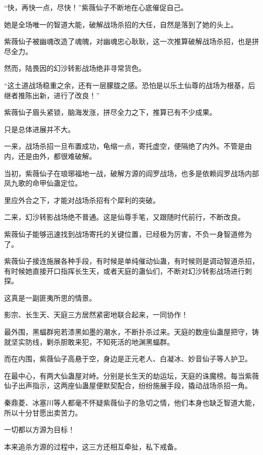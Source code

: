 
\begin{this_body}

“快，再快一点，尽快！”紫薇仙子不断地在心底催促自己。

她是全场唯一的智道大能，破解战场杀招的大任，自然是落到了她的头上。

紫薇仙子被幽魂改造了魂魄，对幽魂忠心耿耿，这一次推算破解战场杀招，也是拼尽全力。

然而，陆畏因的幻沙转影战场绝非寻常货色。

“这土道战场稳重之余，还有一层朦胧之感。恐怕是以乐土仙尊的战场为根基，后继者推陈出新，进行了改良！”

紫薇仙子眉头紧锁，脑海发涨，拼尽全力之下，推算已有不少成果。

只是总体进展并不大。

一来，战场杀招一旦布置成功，龟缩一点，寄托虚空，便隔绝了内外。不管是由内，还是由外，都很难破解。

当初，紫薇仙子在琅琊福地一战，破解方源的阎罗战场，也多是依赖阎罗战场内部凤九歌的命甲仙蛊定位。

里应外合之下，才能对战场杀招有个犀利的突破。

二来，幻沙转影战场绝不普通。这是仙尊手笔，又跟随时代前行，不断改良。

紫薇仙子能够迅速找到战场寄托的关键位置，已经极为厉害，不负一身智道修为了。

紫薇仙子接连施展各种手段，有时候是单纯催动仙蛊，有时候则是调动智道杀招，有时候她直接开口指挥长生天，或者天庭的蛊仙们，不断对幻沙转影战场进行刺探。

这真是一副匪夷所思的情景。

影宗、长生天、天庭三方居然紧密地联合起来，一同协作！

最外围，黑蝠群宛若漆黑如墨的潮水，不断扑杀过来。天庭的数座仙蛊屋把守，铸就坚实防线，剿杀胆敢来犯，不知死活的地渊黑蝠群。

而在内围，紫薇仙子高悬于空，身边是正元老人、白凝冰、妙音仙子等人护卫。

在最中心，有两大仙蛊屋对峙。分别是长生天的劫运坛，天庭的诛魔榜。每当紫薇仙子出声指示，这两座仙蛊屋便默契配合，纷纷施展手段，撬动战场杀招一角。

秦鼎菱、冰塞川等人都毫不怀疑紫薇仙子的急切之情，他们本身也缺乏智道大能，所以十分甘愿出卖苦力。

一切都以方源为目标！

本来追杀方源的过程中，这三方还相互牵扯，私下戒备。


\end{this_body}
